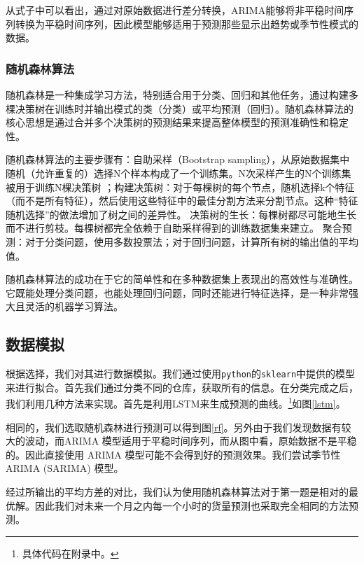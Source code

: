 \documentclass[UTF8,a4paper,10 pt]{article}%
\begin{document}
从式子中可以看出，通过对原始数据进行差分转换，ARIMA能够将非平稳时间序列转换为平稳时间序列，因此模型能够适用于预测那些显示出趋势或季节性模式的数据。
\subsubsection{随机森林算法}
随机森林是一种集成学习方法，特别适合用于分类、回归和其他任务，通过构建多棵决策树在训练时并输出模式的类（分类）或平均预测（回归）。随机森林算法的核心思想是通过合并多个决策树的预测结果来提高整体模型的预测准确性和稳定性。


随机森林算法的主要步骤有：自助采样（Bootstrap sampling），从原始数据集中随机（允许重复的）选择N个样本构成了一个训练集。N次采样产生的N个训练集被用于训练N棵决策树
；构建决策树：对于每棵树的每个节点，随机选择k个特征（而不是所有特征），然后使用这些特征中的最佳分割方法来分割节点。这种“特征随机选择”的做法增加了树之间的差异性。
决策树的生长：每棵树都尽可能地生长而不进行剪枝。每棵树都完全依赖于自助采样得到的训练数据集来建立。
聚合预测：对于分类问题，使用多数投票法；对于回归问题，计算所有树的输出值的平均值。

随机森林算法的成功在于它的简单性和在多种数据集上表现出的高效性与准确性。它既能处理分类问题，也能处理回归问题，同时还能进行特征选择，是一种非常强大且灵活的机器学习算法。



\subsection{数据模拟}
根据选择，我们对其进行数据模拟。我们通过使用{\tt python}的{\tt sklearn}中提供的模型来进行拟合。首先我们通过分类不同的仓库，获取所有的信息。在分类完成之后，我们利用几种方法来实现。首先是利用LSTM来生成预测的曲线。\footnote{具体代码在附录中。}如图\ref{lstm}。

相同的，我们选取随机森林进行预测可以得到图\ref{rf}。另外由于我们发现数据有较大的波动，而ARIMA 模型适用于平稳时间序列，而从图中看，原始数据不是平稳的。因此直接使用 ARIMA 模型可能不会得到好的预测效果。我们尝试季节性 ARIMA (SARIMA) 模型。

经过所输出的平均方差的对比，我们认为使用随机森林算法对于第一题是相对的最优解。因此我们对未来一个月之内每一个小时的货量预测也采取完全相同的方法预测。
\end{document}
